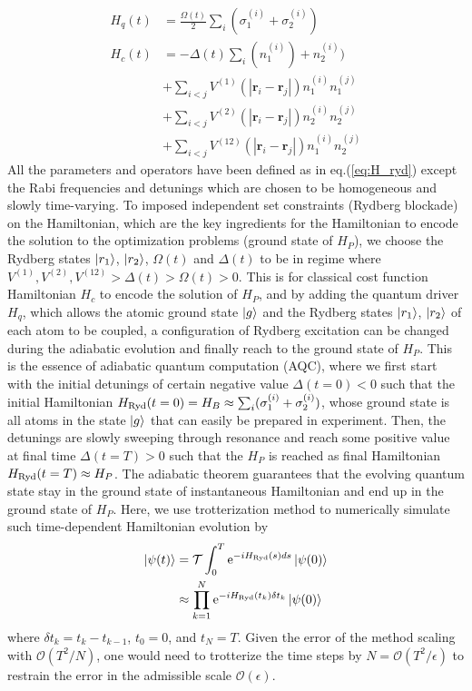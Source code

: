 \documentclass[%
 reprint,
nofootinbib,
 amsmath,amssymb,
 aps,
floatfix,
]{revtex4-2}
\begin{document}
\begin{align}\label{eq:H_Ryd_t}
H_q(t) &=  \frac{\Omega(t)}{2}\sum_{i} (\sigma^{(i)}_1 + \sigma^{(i)}_2) \\
H_c(t) &= -\Delta(t) \sum_{i} (n^{(i)}_1 ) +  n^{(i)}_2)  \\ 
&+ \sum_{i<j} V^{(1)}(|\boldsymbol{r}_i - \boldsymbol{r}_j|) n^{(i)}_1 n^{(j)}_1  \nonumber \\ 
&+ \sum_{i<j} V^{(2)}(|\boldsymbol{r}_i - \boldsymbol{r}_j|) n^{(i)}_2 n^{(j)}_2 \nonumber \\
&+ \sum_{i<j} V^{(12)}(|\boldsymbol{r}_i - \boldsymbol{r}_j|) n^{(i)}_1 n^{(j)}_2 \nonumber
\end{align}
All the parameters and operators have been defined as in eq.(\ref{eq:H_ryd}) except the Rabi frequencies and detunings which are chosen to be homogeneous and slowly time-varying. To imposed independent set constraints (Rydberg blockade) on the Hamiltonian, which are the key ingredients for the Hamiltonian to encode the solution to the optimization problems (ground state of $H_P$), we choose the Rydberg states $\ket{r_1}$, $\ket{r_2}$, $\Omega(t)$ and $\Delta(t)$ to be in regime where $V^{(1)},V^{(2)},V^{(12)} > \Delta(t) > \Omega(t) > 0$. This is for classical cost function Hamiltonian $H_c$ to encode the solution of $H_P$, and by adding the quantum driver $H_q$, which allows the atomic ground state $\ket{g}$ and the Rydberg states $\ket{r_1}$, $\ket{r_2}$ of each atom to be coupled, a configuration of Rydberg excitation can be changed during the adiabatic evolution and finally reach to the ground state of $H_P$. This is the essence of adiabatic quantum computation (AQC), where we first start with the initial detunings of certain negative value $\Delta(t=0) < 0$ such that the initial Hamiltonian $H_{\rm Ryd}(t=0) = H_B \approx \sum_{i} (\sigma^{(i)}_1 +\sigma^{(i)}_2)$, whose ground state is all atoms in the state $\ket{g}$ that can easily be prepared in experiment. Then, the detunings are slowly sweeping through resonance and reach some positive value at final time $\Delta(t=T)>0$ such that the $H_P$ is reached as final Hamiltonian $H_{\rm Ryd}(t=T) \approx H_P$. The adiabatic theorem guarantees that the evolving quantum state stay in the ground state of instantaneous Hamiltonian and end up in the ground state of $H_P$. Here, we use trotterization method to numerically simulate such time-dependent Hamiltonian evolution by 
\begin{align}
    \ket{\psi(t)} &= \mathcal{T}\int_{0}^{T} {\rm e}^{-i H_{\rm Ryd}(s)ds} \ket{\psi(0)} \nonumber \\
    &\approx \prod_{k=1}^{N}  {\rm e}^{-i H_{\rm Ryd}(t_k)\delta t_k} \ket{\psi(0)}
\end{align}
where $\delta t_k = t_k - t_{k-1}$, $t_0 = 0$, and $t_N=T$. Given the error of the method scaling with $\mathcal{O}(T^2/N)$, one would need to trotterize the time steps by $N = \mathcal{O}(T^2/\epsilon)$ to restrain the error in the admissible scale $\mathcal{O}(\epsilon)$.
\end{document}
